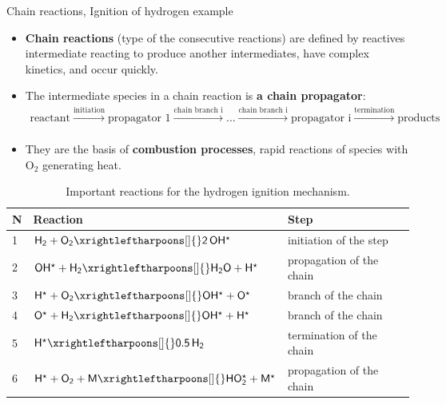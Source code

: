 %
%
\begin{frame}[<+->]{Chain reactions, Ignition of hydrogen example}
	\small
	\begin{itemize}
		\item \alert{\bf Chain reactions} (type of the consecutive reactions) are defined by reactives intermediate reacting to produce another intermediates, 
		have complex kinetics, and occur quickly.
		\item The intermediate species in a chain reaction is \alert{\bf a chain propagator}:
		\begin{multline*}
			\mbox{reactant} \xrightarrow[]{\text{initiation}} \mbox{propagator 1} \xrightarrow[]{\text{chain branch i}} \ldots
			\xrightarrow[]{\text{chain branch i}} \mbox{propagator i} \xrightarrow[]{\text{termination}} \mbox{products} 
		\end{multline*}
		\item They are the basis of \alert{\bf combustion processes}, rapid reactions of species with O$_2$ generating heat. 
	\end{itemize}
	\begin{table}
		\begin{tabular*}{1\textwidth}{@{\extracolsep{\fill}}lll}
			\toprule 
			N & Reaction & Step \\[-5pt]
			\midrule 
			1 & $\mathsf{H_2 + O_2 \xrightleftharpoons[]{} 2\, OH^\star}$ &	initiation of the step \\[-3pt]
			2 & $\mathsf{OH^\star + H_2 \xrightleftharpoons[]{} H_2O + H^\star}$ &	propagation of the chain \\[-3pt]
			3 & $\mathsf{H^\star + O_2 \xrightleftharpoons[]{} OH^\star + O^\star}$ & branch of the chain \\[-3pt]
			4 & $\mathsf{O^\star + H_2 \xrightleftharpoons[]{} OH^\star + H^\star}$ & branch of the chain  \\[-3pt]
			5 & $\mathsf{H^\star \xrightleftharpoons[]{} 0.5 \, H_2}$ &	termination of the chain \\[-3pt]
			6 & $\mathsf{H^\star + O_2 + M \xrightleftharpoons[]{} HO_2^\star +M^\star }$ & propagation of the chain \\[-3pt]
			\bottomrule
		\end{tabular*}
		\caption{Important reactions for the hydrogen ignition mechanism.}
	\end{table}
\end{frame}
%
